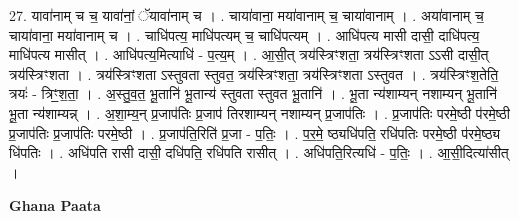 \documentclass[17pt]{extarticle}
\begin{document}
27. यावा॑नाम् च च॒ यावा॑नां॒ ॅयावा॑नाम् च । . चाया॑वाना॒ मया॑वानाम् च॒ चाया॑वानाम् । . अया॑वानाम् च॒ चाया॑वाना॒ मया॑वानाम् च । . चाधि॑पत्य॒ माधि॑पत्यम् च॒ चाधि॑पत्यम् । . आधि॑पत्य मासी दासी॒ दाधि॑पत्य॒ माधि॑पत्य मासीत् । . आधि॑पत्य॒मित्याधि॑ - प॒त्य॒म् । . आ॒सी॒त् त्रय॑स्त्रिꣳशता॒ त्रय॑स्त्रिꣳशता ऽऽसी दासी॒त् त्रय॑स्त्रिꣳशता । . त्रय॑स्त्रिꣳशता ऽस्तुवता स्तुवत॒ त्रय॑स्त्रिꣳशता॒ त्रय॑स्त्रिꣳशता ऽस्तुवत । . त्रय॑स्त्रिꣳश॒तेति॒ त्रयः॑ - त्रिꣳ॒॒श॒ता॒ । . अ॒स्तु॒व॒त॒ भू॒तानि॑ भू॒तान्य॑ स्तुवता स्तुवत भू॒तानि॑ । . भू॒ता न्य॑शाम्यन् नशाम्यन् भू॒तानि॑ भू॒ता न्य॑शाम्यन्न् । . अ॒शा॒म्य॒न् प्र॒जाप॑तिः प्र॒जाप॑ तिरशाम्यन् नशाम्यन् प्र॒जाप॑तिः । . प्र॒जाप॑तिः परमे॒ष्ठी प॑रमे॒ष्ठी प्र॒जाप॑तिः प्र॒जाप॑तिः परमे॒ष्ठी । . प्र॒जाप॑ति॒रिति॑ प्र॒जा - प॒तिः॒ । . प॒र॒मे॒ ष्ठ्यधि॑पति॒ रधि॑पतिः परमे॒ष्ठी प॑रमे॒ष्ठ्य धि॑पतिः । . अधि॑पति रासी दासी॒ दधि॑पति॒ रधि॑पति रासीत् । . अधि॑पति॒रित्यधि॑ - प॒तिः॒ । . आ॒सी॒दित्या॑सीत् । \newline

\textbf{Ghana Paata } \newline
\end{document}
